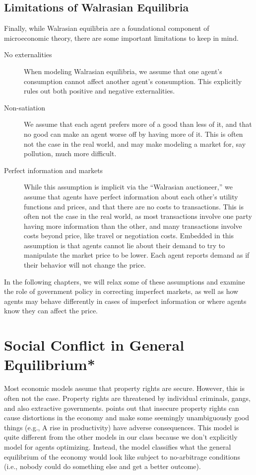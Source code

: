 \subsection*{Limitations of Walrasian Equilibria}
Finally, while Walrasian equilibria are a foundational component of microeconomic theory, there are some important limitations to keep in mind.
\begin{description}
    \item[No externalities] When modeling Walrasian equilibria, we assume that one agent's consumption cannot affect another agent's consumption. This explicitly rules out both positive and negative externalities.
    \item[Non-satiation] We assume that each agent prefers more of a good than less of it, and that no good can make an agent worse off by having more of it. This is often not the case in the real world, and may make modeling a market for, say pollution, much more difficult.
    \item[Perfect information and markets] While this assumption is implicit via the ``Walrasian auctioneer,'' we assume that agents have perfect information about each other's utility functions and prices, and that there are no costs to transactions. This is often not the case in the real world, as most transactions involve one party having more information than the other, and many transactions involve costs beyond price, like travel or negotiation costs. Embedded in this assumption is that agents cannot lie about their demand to try to manipulate the market price to be lower. Each agent reports demand as if their behavior will not change the price.  
\end{description}
In the following chapters, we will relax some of these assumptions and examine the role of government policy in correcting imperfect markets, as well as how agents may behave differently in cases of imperfect information or where agents know they can affect the price. 


\section{Social Conflict in General Equilibrium*}
Most economic models assume that property rights are secure. However, this is often not the case. Property rights are threatened by individual criminals, gangs, and also extractive governments. \citet{dalbodalbo} points out that insecure property rights can cause distortions in the economy and make some seemingly unambiguously good things (e.g., A rise in productivity) have adverse consequences. This model is quite different from the other models in our class because we don't explicitly model for agents optimizing. Instead, the model classifies what the general equilibrium of the economy would look like subject to no-arbitrage conditions (i.e., nobody could do something else and get a better outcome).

